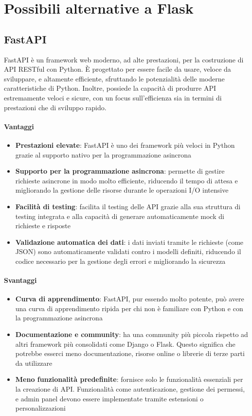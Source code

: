 \documentclass{article}
\begin{document}
\section{Possibili alternative a Flask}

\subsection{FastAPI}
FastAPI è un framework web moderno, ad alte prestazioni, per la 
costruzione di API RESTful con Python. È progettato per essere facile 
da usare, veloce da sviluppare, e altamente efficiente, sfruttando 
le potenzialità delle moderne caratteristiche di Python. Inoltre, 
possiede la capacità di produrre API estremamente veloci e sicure, 
con un focus sull'efficienza sia in termini di prestazioni che di 
sviluppo rapido.
\paragraph*{Vantaggi}
\begin{itemize}
    \item \textbf{Prestazioni elevate}: FastAPI è uno dei framework 
    più veloci in Python grazie al supporto nativo per la programmazione 
    asincrona
    \item \textbf{Supporto per la programmazione asincrona}: permette 
    di gestire richieste asincrone in modo molto efficiente, riducendo 
    il tempo di attesa e migliorando la gestione delle risorse durante 
    le operazioni I/O intensive
    \item \textbf{Facilità di testing}: facilita il testing delle API 
    grazie alla sua struttura di testing integrata e alla capacità di 
    generare automaticamente mock di richieste e risposte
    \item \textbf{Validazione automatica dei dati}: i dati inviati 
    tramite le richieste (come JSON) sono automaticamente validati 
    contro i modelli definiti, riducendo il codice necessario per la 
    gestione degli errori e migliorando la sicurezza
\end{itemize}
\paragraph*{Svantaggi}
\begin{itemize}
    \item \textbf{Curva di apprendimento}: FastAPI, pur essendo molto 
    potente, può avere una curva di apprendimento ripida per chi non è 
    familiare con Python e con la programmazione asincrona
    \item \textbf{Documentazione e community}: ha una community più 
    piccola rispetto ad altri framework più consolidati come Django o 
    Flask. Questo significa che potrebbe esserci meno documentazione, 
    risorse online o librerie di terze parti da utilizzare
    \item \textbf{Meno funzionalità predefinite}: fornisce solo le 
    funzionalità essenziali per la creazione di API. Funzionalità come 
    autenticazione, gestione dei permessi, e admin panel devono essere 
    implementate tramite estensioni o personalizzazioni
\end{itemize}
\end{document}

